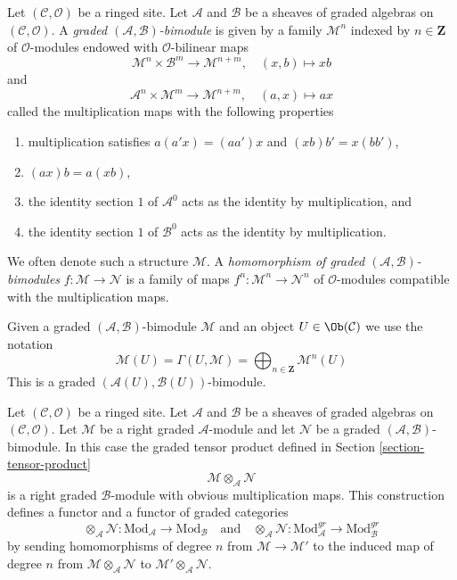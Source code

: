 \begin{definition}
\label{definition-bimodule}
Let $(\mathcal{C}, \mathcal{O})$ be a ringed site. Let $\mathcal{A}$
and $\mathcal{B}$ be a sheaves of graded algebras on
$(\mathcal{C}, \mathcal{O})$. A
{\it graded $(\mathcal{A}, \mathcal{B})$-bimodule}
is given by a family $\mathcal{M}^n$ indexed by $n \in \mathbf{Z}$
of $\mathcal{O}$-modules endowed with $\mathcal{O}$-bilinear maps
$$
\mathcal{M}^n \times \mathcal{B}^m \to \mathcal{M}^{n + m},\quad
(x, b) \longmapsto xb
$$
and
$$
\mathcal{A}^n \times \mathcal{M}^m \to \mathcal{M}^{n + m},\quad
(a, x) \longmapsto ax
$$
called the multiplication maps with the following properties
\begin{enumerate}
\item multiplication satisfies $a(a'x) = (aa')x$ and
$(xb)b' = x(bb')$,
\item $(ax)b = a(xb)$,
\item the identity section $1$ of $\mathcal{A}^0$ acts as the
identity by multiplication, and
\item the identity section $1$ of
$\mathcal{B}^0$ acts as the identity by multiplication.
\end{enumerate}
We often denote such a structure $\mathcal{M}$.
A {\it homomorphism of graded $(\mathcal{A}, \mathcal{B})$-bimodules}
$f : \mathcal{M} \to \mathcal{N}$ is a family of maps
$f^n : \mathcal{M}^n \to \mathcal{N}^n$
of $\mathcal{O}$-modules compatible with the multiplication maps.
\end{definition}

\noindent
Given a graded $(\mathcal{A}, \mathcal{B})$-bimodule $\mathcal{M}$
and an object $U \in \Ob(\mathcal{C})$ we use the notation
$$
\mathcal{M}(U) =
\Gamma(U, \mathcal{M}) =
\bigoplus\nolimits_{n \in \mathbf{Z}} \mathcal{M}^n(U)
$$
This is a graded $(\mathcal{A}(U), \mathcal{B}(U))$-bimodule.

\medskip\noindent
Let $(\mathcal{C}, \mathcal{O})$ be a ringed site. Let $\mathcal{A}$
and $\mathcal{B}$ be a sheaves of graded algebras on
$(\mathcal{C}, \mathcal{O})$. Let $\mathcal{M}$ be a right
graded $\mathcal{A}$-module and let $\mathcal{N}$ be a
graded $(\mathcal{A}, \mathcal{B})$-bimodule. In this case the
graded tensor product defined in Section \ref{section-tensor-product}
$$
\mathcal{M} \otimes_\mathcal{A} \mathcal{N}
$$
is a right graded $\mathcal{B}$-module with obvious multiplication maps.
This construction defines a functor and a functor of graded categories
$$
\otimes_\mathcal{A} \mathcal{N} :
\text{Mod}_\mathcal{A}
\longrightarrow
\text{Mod}_\mathcal{B}
\quad\text{and}\quad
\otimes_\mathcal{A} \mathcal{N} :
\text{Mod}^{gr}_\mathcal{A}
\longrightarrow
\text{Mod}^{gr}_\mathcal{B}
$$
by sending homomorphisms of degree $n$ from $\mathcal{M} \to \mathcal{M}'$
to the induced map of degree $n$ from
$\mathcal{M} \otimes_\mathcal{A} \mathcal{N}$ to
$\mathcal{M}' \otimes_\mathcal{A} \mathcal{N}$.

